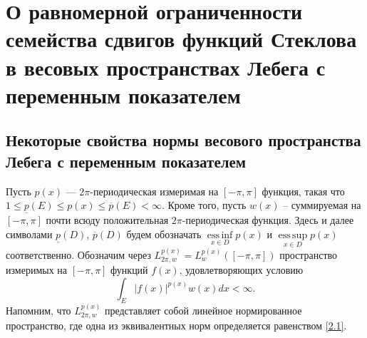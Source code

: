 \chapter{О равномерной ограниченности семейства сдвигов функций Стеклова в весовых пространствах Лебега с переменным показателем}


\section{Некоторые свойства нормы весового пространства Лебега с переменным показателем}

Пусть $p(x)$ --- $2\pi$-периодическая   измеримая на $[-\pi,\pi]$ функция, такая что $1\le\underline{p}(E)\le p(x)\le\overline{p}(E)<\infty$.
 Кроме того, пусть $w(x)$ -- суммируемая на $[-\pi,\pi]$ почти всюду положительная $2\pi$-периодическая функция. Здесь и далее символами $\underline{p}(D)$, $\overline{p}(D)$ будем обозначать $\operatorname*{ess\,inf}\limits_{x \in D}p(x)$ и $\operatorname*{ess\,sup}\limits_{x \in D}p(x)$ соответственно.
Обозначим через $L^{p(x)}_{2\pi,w} = L^{p(x)}_{w}([-\pi,\pi])$ пространство измеримых на $[-\pi,\pi]$ функций $f(x)$, удовлетворяющих условию
\begin{equation*}
    \int_E|f(x)|^{p(x)}w(x)dx<\infty.
\end{equation*}
Напомним, что  $L^{p(x)}_{2\pi,w}$ представляет собой линейное нормированное пространство, где одна из эквивалентных норм определяется равенством \eqref{2.1}.

